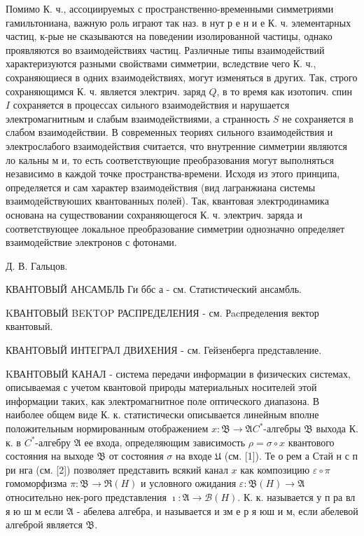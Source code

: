 \documentclass[10pt]{article}
\begin{document}
Помимо К. ч., ассоциируемых с пространственно-временными симметриями гамильтониана, важную роль играют так наз. в нут р е н и е К. ч. элементарных частиц, к-рые не сказываются на поведении изолированной частицы, однако проявляются во взаимодействиях частиц. Различные типы взаимодействий характеризуются разными свойствами симметрии, вследствие чего К. ч., сохраняющиеся в одних взаимодействиях, могут изменяться в других. Так, строго сохраняющимся К. ч. является электрич. заряд $Q$, в то время как изотопич. спин $I$ сохраняется в процессах сильного взаимодействия и нарушается электромагнитным и слабым взаимодействиями, а странность $S$ не сохраняется в слабом взаимодействии. В современных теориях сильного взаимодействия и электрослабого взаимодействия считается, что внутренние симметрии являются ло кальны м и, то есть соответствующие преобразования могут выполняться независимо в каждой точке пространства-времени. Исходя из этого принципа, определяется и сам характер взаимодействия (вид лагранжиана системы взаимодействуюших квантованных полей). Так, квантовая электродинамика основана на существовании сохраняющегося К. ч. электрич. заряда и соответствующее локальное преобразование симметрии однозначно определяет взаимодействие электронов с фотонами.



Д. В. Гальцов.



КВАНТОВЫЙ АНСАМБЛЬ Ги ббс а - см. Статистический ансамбль.



KВАНТОВЫЙ BEKTOP РАСПРЕДЕЛЕНИЯ - см. Рacпределения вектор квантовый.



КВАНТОВЫЙ ИНТЕГРАЛ ДВИХЕНИЯ - см. Гейзенберга представление.



KВАНТОВЫЙ КАНАЛ - система передачи информации в физических системах, описываемая с учетом квантовой природы материальных носителей этой информации таких, как электромагнитное поле оптического диапазона. В наиболее общем виде К. к. статистически описывается линейным вполне положительным нормированным отображением $x: \mathfrak{B} \rightarrow \mathfrak{A} C^{*}$-алгебры $\mathfrak{B}$ выхода К. к. в $C^{*}$-алгебру $\mathfrak{A}$ ее входа, определяющим зависимость $\rho=\sigma \circ x$ квантового состояния на выходе $\mathfrak{B}$ от состояния $\sigma$ на входе $\mathfrak{U}$ (см. [1]). Те о рем а Стай н с п ри нга (см. [2]) позволяет представить всякий канал $x$ как композицию $\varepsilon \circ \pi$ гомоморфизма $\pi: \mathfrak{B} \rightarrow \Re(H)$ и условного ожидания $\varepsilon: \mathfrak{B}(H) \rightarrow \mathfrak{A}$ относительно нек-рого представления $\imath: \mathfrak{A} \rightarrow \mathcal{B}(H)$. К. к. называется у п ра вл я ю ш м если $\mathfrak{A}$ - абелева алгебра, и называется и зм е р я юш и м, если абелевой алгеброй является $\mathfrak{B}$.
\end{document}
